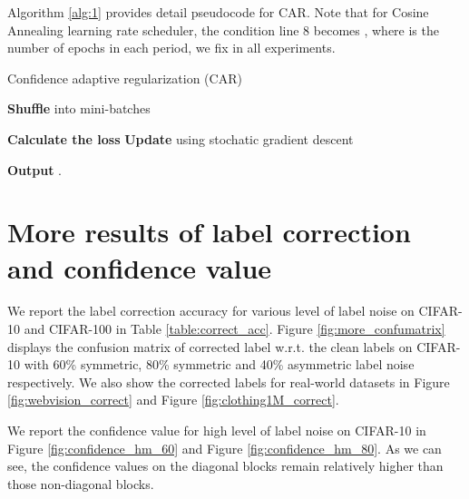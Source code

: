 \documentclass{article}
\begin{document}
Algorithm \ref{alg:1} provides detail pseudocode for CAR. Note that for Cosine Annealing learning rate scheduler, the condition line 8 becomes , where  is the number of epochs in each period, we fix  in all experiments. 

\begin{algorithm} [htb!]
	\nonumber
	\small
	\caption{Confidence adaptive regularization (CAR)}
	\label{alg:1}
	 \qquad \qquad\qquad\qquad\qquad\qquad\qquad\qquad\quad\quad \qquad\quad{}\;
	\For{}
	{
		\textbf{Shuffle}  into  mini-batches \;
		\For{}
		{
			{
				 \qquad\qquad\qquad\quad {}\;
				 \qquad\qquad\qquad\qquad\qquad {}\;
				
			}
			\textbf{Calculate the loss}  \;
			\textbf{Update}  using stochatic gradient descent \; 
			
		}
	}
	\textbf{Output} .
\end{algorithm}


\section{More results of label correction and confidence value}
\label{sec:more_label_correct}	
We report the label correction accuracy for various level of label noise on CIFAR-10 and CIFAR-100 in Table \ref{table:correct_acc}. Figure \ref{fig:more_confumatrix} displays the confusion matrix of corrected label w.r.t. the clean labels on CIFAR-10 with 60\% symmetric, 80\% symmetric and 40\% asymmetric label noise respectively. We also show the corrected labels for real-world datasets in Figure \ref{fig:webvision_correct} and Figure \ref{fig:clothing1M_correct}.

We report the confidence value for high level of label noise on CIFAR-10 in Figure \ref{fig:confidence_hm_60} and Figure \ref{fig:confidence_hm_80}. As we can see, the confidence values on the diagonal blocks remain relatively higher than those non-diagonal blocks.
\end{document}
